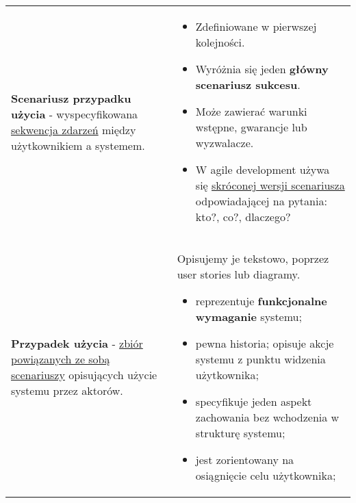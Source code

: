 \documentclass[../main.tex]{subfiles}
\begin{document}
    \begin{table}[H]
        \begin{center}
            \begin{tabular}{  p{6cm} p{10cm}  }

                \textbf{Scenariusz przypadku użycia} - wyspecyfikowana \underline{sekwencja zdarzeń} między użytkownikiem a systemem.
                &
                \begin{itemize}
                    \item Zdefiniowane w pierwszej kolejności.
                    \item Wyróżnia się jeden \textbf{główny scenariusz sukcesu}.
                    \item Może zawierać warunki wstępne, gwarancje lub wyzwalacze.
                    \item W agile development używa się \underline{skróconej wersji scenariusza} odpowiadającej
                    na pytania: kto?, co?, dlaczego?
                \end{itemize}
                \\

                \cmidrule(r){1-1}\cmidrule(l){2-2}

                \textbf{Przypadek użycia} - \underline{zbiór powiązanych ze sobą scenariuszy} opisujących użycie systemu przez aktorów.
                &
                    Opisujemy je tekstowo, poprzez user stories lub diagramy.
                    \begin{itemize}
                        \item reprezentuje \textbf{funkcjonalne wymaganie} systemu;
                        \item pewna historia; opisuje akcje systemu z punktu widzenia użytkownika;
                        \item specyfikuje jeden aspekt zachowania bez wchodzenia w strukturę systemu;
                        \item jest zorientowany na osiągnięcie celu użytkownika;
                    \end{itemize}
                \\

                \end{tabular}
        \end{center}
    \end{table}
\end{document}
